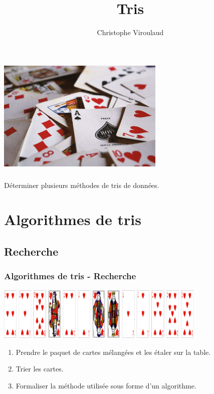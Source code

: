 \documentclass[svgnames,11pt]{beamer}
\author[]{Christophe Viroulaud}
\title{Tris}
\date{\framebox{\textbf{Algo 04}}}
\institute{Première - NSI}
\begin{document}
\begin{frame}
    \titlepage
\end{frame}
\begin{frame}
    \frametitle{}

    \begin{center}
        \centering
        \includegraphics[width=8cm]{ressources/cartes.jpg}
        \label{IMG}
    \end{center}

\end{frame}
\begin{frame}
    \frametitle{}

    \begin{framed}
        \centering Déterminer plusieurs méthodes de tris de données.
    \end{framed}

\end{frame}
\section{Algorithmes de tris}
\subsection{Recherche}
\begin{frame}
    \frametitle{Algorithmes de tris - Recherche}
    \begin{center}
        \centering
        \includegraphics[width=10cm]{ressources/jeu-coeur-melange.png}
    \end{center}
    \begin{activite}
        \begin{enumerate}
            \item Prendre le paquet de cartes mélangées et les étaler sur la table.
            \item Trier les cartes.
            \item Formaliser la méthode utilisée sous forme d'un algorithme.
        \end{enumerate}
    \end{activite}

\end{frame}
\end{document}
